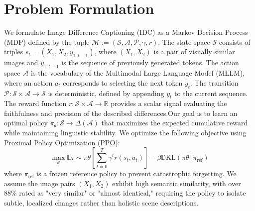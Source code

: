 \section{Problem Formulation}

We formulate Image Difference Captioning (IDC) as a Markov Decision Process (MDP) defined by the tuple $\mathcal{M} := (\mathcal{S}, \mathcal{A}, \mathcal{P}, \gamma, r)$. The state space $\mathcal{S}$ consists of triples $s_t = (X_1, X_2, y_{1:t-1})$, where $(X_1, X_2)$ is a pair of visually similar images and $y_{1:t-1}$ is the sequence of previously generated tokens. The action space $\mathcal{A}$ is the vocabulary of the Multimodal Large Language Model (MLLM), where an action $a_t$ corresponds to selecting the next token $y_t$. The transition $\mathcal{P}: \mathcal{S} \times \mathcal{A} \rightarrow \mathcal{S}$ is deterministic, defined by appending $y_t$ to the current sequence. The reward function $r: \mathcal{S} \times \mathcal{A} \rightarrow \mathbb{R}$ provides a scalar signal evaluating the faithfulness and precision of the described differences.Our goal is to learn an optimal policy $\pi_\theta: \mathcal{S} \rightarrow \Delta(\mathcal{A})$ that maximizes the expected cumulative reward while maintaining linguistic stability. We optimize the following objective using Proximal Policy Optimization (PPO):
\begin{equation}
\max_{\theta} \mathbb{E}{\tau \sim \pi{\theta}} \left[ \sum_{t=0}^{T} \gamma^t r(s_t, a_t) \right] - \beta \mathbb{D}{\text{KL}}(\pi{\theta} || \pi_{\text{ref}})
\end{equation}
where $\pi_{\text{ref}}$ is a frozen reference policy to prevent catastrophic forgetting. We assume the image pairs $(X_1, X_2)$ exhibit high semantic similarity, with over 88\% rated as "very similar" or "almost identical," requiring the policy to isolate subtle, localized changes rather than holistic scene descriptions.